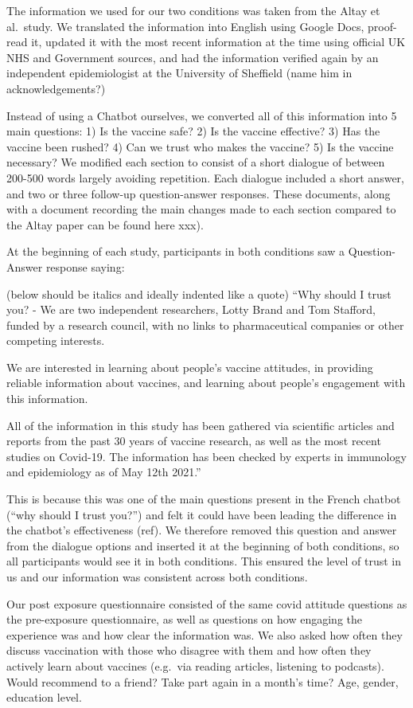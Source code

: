 \documentclass[
  english,
  ,jou,floatsintext]{apa6}
\begin{document}
The information we used for our two conditions was taken from the Altay et al.~study. We translated the information into English using Google Docs, proof-read it, updated it with the most recent information at the time using official UK NHS and Government sources, and had the information verified again by an independent epidemiologist at the University of Sheffield (name him in acknowledgements?)

Instead of using a Chatbot ourselves, we converted all of this information into 5 main questions: 1) Is the vaccine safe? 2) Is the vaccine effective? 3) Has the vaccine been rushed? 4) Can we trust who makes the vaccine? 5) Is the vaccine necessary? We modified each section to consist of a short dialogue of between 200-500 words largely avoiding repetition. Each dialogue included a short answer, and two or three follow-up question-answer responses. These documents, along with a document recording the main changes made to each section compared to the Altay paper can be found here xxx).

At the beginning of each study, participants in both conditions saw a Question-Answer response saying:

(below should be italics and ideally indented like a quote)
``Why should I trust you? - We are two independent researchers, Lotty Brand and Tom Stafford, funded by a research council, with no links to pharmaceutical companies or other competing interests.

We are interested in learning about people's vaccine attitudes, in providing reliable information about vaccines, and learning about people's engagement with this information.

All of the information in this study has been gathered via scientific articles and reports from the past 30 years of vaccine research, as well as the most recent studies on Covid-19. The information has been checked by experts in immunology and epidemiology as of May 12th 2021.''

This is because this was one of the main questions present in the French chatbot (``why should I trust you?'') and felt it could have been leading the difference in the chatbot's effectiveness (ref). We therefore removed this question and answer from the dialogue options and inserted it at the beginning of both conditions, so all participants would see it in both conditions. This ensured the level of trust in us and our information was consistent across both conditions.

Our post exposure questionnaire consisted of the same covid attitude questions as the pre-exposure questionnaire, as well as questions on how engaging the experience was and how clear the information was. We also asked how often they discuss vaccination with those who disagree with them and how often they actively learn about vaccines (e.g.~via reading articles, listening to podcasts). Would recommend to a friend? Take part again in a month's time? Age, gender, education level.
\end{document}

